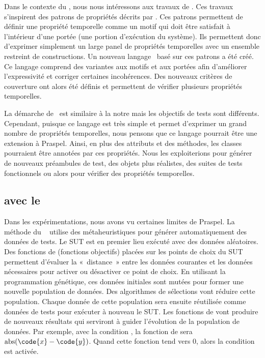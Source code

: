 Dans le contexte du , nous nous intéressons
aux travaux de . Ces travaux s'inspirent des patrons de
propriétés décrits par . Ces patrons permettent de définir une
propriété temporelle comme un motif qui doit être satisfait à l'intérieur d'une
portée (une portion d'exécution du système). Ils permettent donc d'exprimer
simplement un large panel de propriétés temporelles avec un ensemble restreint
de constructions. Un nouveau langage~ basé sur ces
patrons a été créé. Ce langage comprend des variantes aux motifs et aux portées
afin d'améliorer l'expressivité et corriger certaines incohérences. Des nouveaux
critères de couverture ont alors été définis et permettent de vérifier plusieurs
propriétés temporelles.

La démarche de~ est similaire à la notre mais les objectifs
de tests sont différents. Cependant, puisque ce langage est très simple et
permet d'exprimer un grand nombre de propriétés temporelles, nous pensons que ce
langage pourrait être une extension à Praspel. Ainsi, en plus des attributs et
des méthodes, les classes pourraient être annotées par ces propriétés. Nous les
exploiterions pour générer de nouveaux préambules de test, des objets plus
réalistes, des suites de tests fonctionnels ou alors pour vérifier des
propriétés temporelles.

\subsection{ avec le }

Dans les expérimentations, nous avons vu certaines limites de Praspel. La
méthode du ~ utilise des
métaheuristiques pour générer automatiquement des données de tests. Le SUT est
en premier lieu exécuté avec des données aléatoires. Des fonctions de
 (fonctions objectifs) placées sur les points de choix du SUT
permettent d'évaluer la «~distance~» entre les données courantes et les données
nécessaires pour activer ou désactiver ce point de choix. En utilisant la
programmation génétique, ces données initiales sont mutées pour former une
nouvelle population de données. Des algorithmes de sélections vont réduire cette
population. Chaque donnée de cette population sera ensuite réutilisée comme
données de tests pour exécuter à nouveau le SUT. Les fonctions de
 vont produire de nouveaux résultats qui serviront à guider
l'évolution de la population de données. Par exemple, avec la condition , la fonction de  sera $\mathrm{abs}(\code{x} -
\code{y})$. Quand cette fonction tend vers 0, alors la condition est activée.

